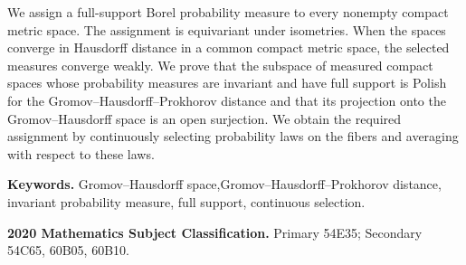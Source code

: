We assign a full-support Borel probability measure to every nonempty compact metric space. The assignment is equivariant under isometries. When the spaces converge in Hausdorff distance in a common compact metric space, the selected measures converge weakly. We prove that the subspace of measured compact spaces whose probability measures are invariant and have full support is Polish for the Gromov--Hausdorff--Prokhorov distance and that its projection onto the Gromov--Hausdorff space is an open surjection. We obtain the required assignment by continuously selecting probability laws on the fibers and averaging with respect to these laws.

\par\smallskip
\noindent\textbf{Keywords.} Gromov--Hausdorff space,\newline Gromov--Hausdorff--Prokhorov distance, invariant probability measure, full support, continuous selection.

\par\smallskip
\noindent\textbf{2020 Mathematics Subject Classification.} Primary 54E35; Secondary 54C65, 60B05, 60B10.
